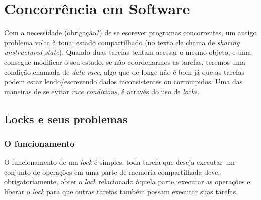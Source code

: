 \documentclass[]{article}
\begin{document}
\section{Concorrência em Software}		
	\par Com a necessidade (obrigação?) de se escrever programas concorrentes, um antigo problema volta à tona: estado
	compartilhado (no texto ele chama de \textit{sharing unstructured state}). Quando duas tarefas tentam acessar o mesmo
	objeto, e uma consegue modificar o seu estado, se não coordenarmos as tarefas, teremos uma condição  chamada de
	\textit{data race}, algo que de longe não é bom já que as tarefas podem estar lendo/escrevendo dados inconsistentes
	ou corrompidos. Uma das maneiras de se evitar \textit{race conditions}, é através do uso de \textit{locks}.
	
	\subsection{Locks e seus problemas}

	\subsubsection{O funcionamento}
		\par O funcionamento de um \textit{lock} é simples: toda tarefa que deseja executar um conjunto de operações em
		uma parte de memória compartilhada deve, obrigatoriamente, obter o \textit{lock} relacionado àquela parte, 
		executar as operações e liberar o \textit{lock} para que outras tarefas também possam executar suas tarefas.
	
\end{document}
